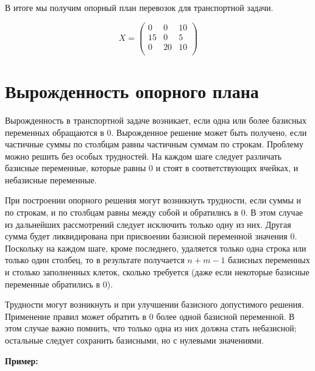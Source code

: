 \documentclass[a4paper,12pt]{article}
\begin{document}
	В итоге мы получим опорный план перевозок для транспортной задачи.
	
	\begin{equation}
		X = 
		\begin{pmatrix}
			0 & 0 & 10 \\
			15 & 0 & 5 \\
			0 & 20 & 10 \\ 
		\end{pmatrix}
	\end{equation}
	\clearpage
	
\section{Вырожденность опорного плана}
	Вырожденность в транспортной задаче возникает, если одна или более базисных переменных обращаются в 0. Вырожденное решение может быть получено, если частичные суммы по столбцам равны частичным суммам по строкам. Проблему можно решить без особых трудностей. На каждом шаге следует различать базисные переменные, которые равны $0$ и стоят в соответствующих ячейках, и небазисные переменные.
	
	При построении опорного решения могут возникнуть трудности, если суммы и по строкам, и по столбцам равны между собой и обратились в $0$. В этом случае из дальнейших рассмотрений следует исключить только одну из них. Другая сумма будет ликвидирована при присвоении базисной переменной значения 0. Поскольку на каждом шаге, кроме последнего, удаляется только одна строка или только один столбец, то в результате получается $n + m - 1$ базисных переменных и столько заполненных клеток, сколько требуется (даже если некоторые базисные переменные обратились в $0$).
	
	Трудности могут возникнуть и при улучшении базисного допустимого решения. Применение правил может обратить в 0 более одной базисной переменной. В этом случае важно помнить, что только одна из них должна стать небазисной; остальные следует сохранить базисными, но с нулевыми значениями.
	
	\textbf{Пример:}
	
\end{document}
